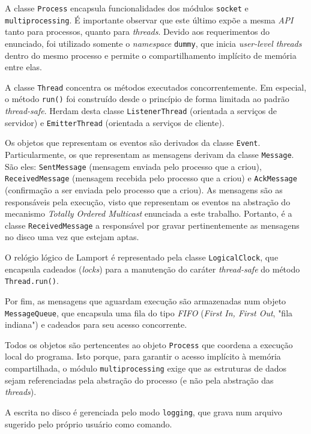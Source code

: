 \documentclass[a4paper,12pt]{article}
\begin{document}
        A classe \texttt{Process} encapsula funcionalidades dos módulos \texttt{socket} \cite{WEBSITE:7} e \texttt{multiprocessing}.
        É importante observar que este último expõe a mesma \emph{API} tanto para processos, quanto para \emph{threads}.
        Devido aos requerimentos do enunciado, foi utilizado somente o \emph{namespace} \texttt{dummy}, que inicia \emph{user-level threads} dentro do mesmo processo e permite o compartilhamento implícito de memória entre elas.

        A classe \texttt{Thread} concentra os métodos executados concorrentemente.
        Em especial, o método \texttt{run()} foi construído desde o princípio de forma limitada ao padrão \emph{thread-safe}.
        Herdam desta classe \texttt{ListenerThread} (orientada a serviços de servidor) e \texttt{EmitterThread} (orientada a serviços de cliente).

        Os objetos que representam os eventos são derivados da classe \texttt{Event}.
        Particularmente, os que representam as mensagens derivam da classe \texttt{Message}.
        São eles: \texttt{SentMessage} (mensagem enviada pelo processo que a criou), \texttt{ReceivedMessage} (mensagem recebida pelo processo que a criou) e \texttt{AckMessage} (confirmação a ser enviada pelo processo que a criou).
        As mensagens são as responsáveis pela execução, visto que representam os eventos na abstração do mecanismo \emph{Totally Ordered Multicast} enunciada a este trabalho.
        Portanto, é a classe \texttt{ReceivedMessage} a responsável por gravar pertinentemente as mensagens no disco uma vez que estejam aptas.

        O relógio lógico de Lamport é representado pela classe \texttt{LogicalClock}, que encapsula cadeados (\emph{locks}) para a manutenção do caráter \emph{thread-safe} do método \texttt{Thread.run()}.

        Por fim, as mensagens que aguardam execução são armazenadas num objeto \texttt{MessageQueue}, que encapsula uma fila do tipo \emph{FIFO} (\emph{First In, First Out}, "fila indiana") e cadeados para seu acesso concorrente.

        Todos os objetos são pertencentes ao objeto \texttt{Process} que coordena a execução local do programa.
        Isto porque, para garantir o acesso implícito à memória compartilhada, o módulo \texttt{multiprocessing} exige que as estruturas de dados sejam referenciadas pela abstração do processo (e não pela abstração das \emph{threads}).

        A escrita no disco é gerenciada pelo modo \texttt{logging}, que grava num arquivo sugerido pelo próprio usuário como comando.
\end{document}

